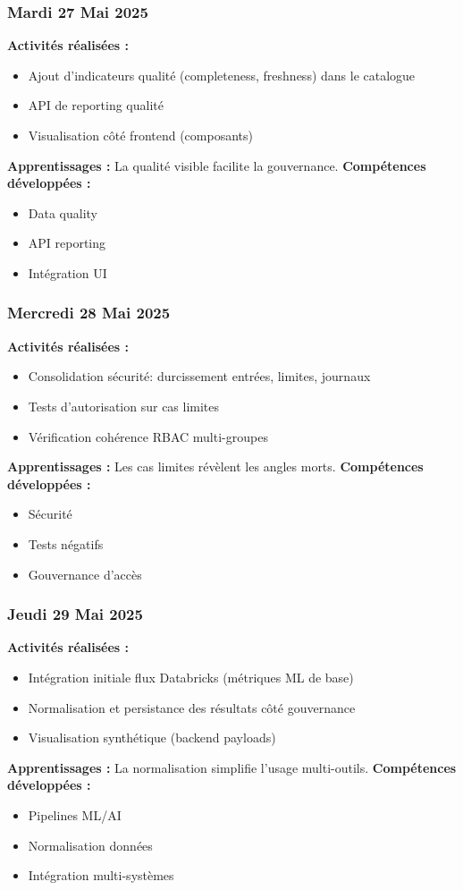 \documentclass[12pt,a4paper]{article}
\begin{document}
\subsubsection{Mardi 27 Mai 2025}
\textbf{Activités réalisées :}
\begin{itemize}
    \item Ajout d'indicateurs qualité (completeness, freshness) dans le catalogue
    \item API de reporting qualité
    \item Visualisation côté frontend (composants)
\end{itemize}
\textbf{Apprentissages :} La qualité visible facilite la gouvernance.
\textbf{Compétences développées :}
\begin{itemize}
    \item Data quality
    \item API reporting
    \item Intégration UI
\end{itemize}

\subsubsection{Mercredi 28 Mai 2025}
\textbf{Activités réalisées :}
\begin{itemize}
    \item Consolidation sécurité: durcissement entrées, limites, journaux
    \item Tests d'autorisation sur cas limites
    \item Vérification cohérence RBAC multi-groupes
\end{itemize}
\textbf{Apprentissages :} Les cas limites révèlent les angles morts.
\textbf{Compétences développées :}
\begin{itemize}
    \item Sécurité
    \item Tests négatifs
    \item Gouvernance d'accès
\end{itemize}

\subsubsection{Jeudi 29 Mai 2025}
\textbf{Activités réalisées :}
\begin{itemize}
    \item Intégration initiale flux Databricks (métriques ML de base)
    \item Normalisation et persistance des résultats côté gouvernance
    \item Visualisation synthétique (backend payloads)
\end{itemize}
\textbf{Apprentissages :} La normalisation simplifie l'usage multi-outils.
\textbf{Compétences développées :}
\begin{itemize}
    \item Pipelines ML/AI
    \item Normalisation données
    \item Intégration multi-systèmes
\end{itemize}
\end{document}
